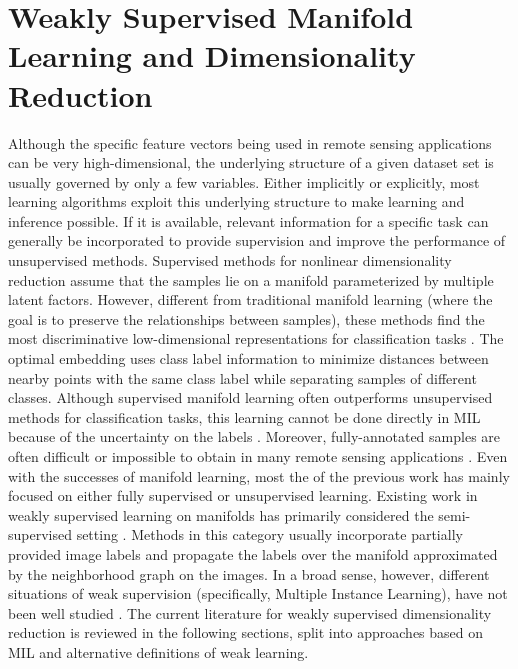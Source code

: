 \section{Weakly Supervised Manifold Learning and Dimensionality Reduction}
Although the specific feature vectors being used in remote sensing applications can be very high-dimensional, the underlying structure of a given dataset set is usually governed by only a few variables. Either implicitly or explicitly, most learning algorithms exploit this underlying structure to make learning and inference possible.
If it is available, relevant information for a specific task can generally be incorporated to provide supervision and improve the performance of unsupervised methods.  Supervised methods for nonlinear dimensionality reduction assume that the samples lie on a manifold parameterized by multiple latent factors.  However, different from traditional manifold learning (where the goal is to preserve the relationships between samples), these methods find the most discriminative low-dimensional representations for classification tasks \citep{Wu2015MILImageManifoldThesis}.  The optimal embedding uses class label information to  minimize distances between nearby points with the same class label while separating samples of different classes.  Although supervised manifold learning often outperforms unsupervised methods for classification tasks, this learning cannot be done directly in  MIL because of the uncertainty on the labels \citep{Carbonneau2016MILSurvey}.  Moreover, fully-annotated samples are often difficult or impossible to obtain in many remote sensing applications \citep{Zare2016MIACE}.  Even with the successes of manifold learning, most the of the previous work has mainly focused on either fully supervised or unsupervised learning.   Existing work in weakly supervised learning on manifolds has primarily considered the semi-supervised setting \citep{Zhang2008SpectralSemiSupManifoldLearning,Chen2018RobustSemiSupManifoldLearning,Zhang2014SemiSupManLearningFusion,Hong2019LearnableManifoldAlignment,Navaratnam2007JointManifoldSemiSupRegression,Stanley2019ManAlignmentFeatureCorrespondence,Tuia2015KernelManifoldAlignment,Wang2010MultiscaleManAlignment,Wang2011HeteroDomainAdaptationManAlignment}.  Methods in this category usually incorporate partially provided image labels and propagate the labels over the manifold approximated by the neighborhood graph on the images.  In a broad sense, however, different situations of weak supervision (specifically, Multiple Instance  Learning), have not been well studied \citep{Wu2015MILImageManifoldThesis}.  The current literature for weakly supervised dimensionality reduction is reviewed in the following sections, split into approaches based on MIL and alternative definitions of weak learning.


